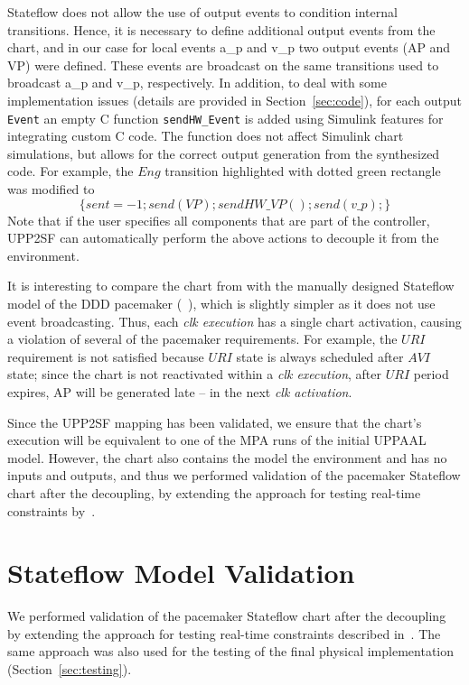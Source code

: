 Stateflow does not allow the use of output events to condition internal transitions. Hence, it is necessary to define additional output events from the chart, and in our case for local events a\_p and v\_p two output events (AP and VP) were defined. These events are broadcast on the same transitions used to broadcast a\_p and v\_p, respectively. In addition, to deal with some implementation issues (details are provided in Section~\ref{sec:code}), for each output \texttt{Event} an empty C function \texttt{sendHW\_Event} is added using Simulink features for integrating custom C code. The function does not affect Simulink chart simulations, but allows for the correct output generation from the synthesized code. For example, the $Eng$ transition highlighted with dotted green rectangle was modified to 
\begin{equation*}
[(sent==3)]\{sent=-1;send(VP);sendHW\_VP();send(v\_p);\}
\end{equation*}
Note that if the user specifies all components that are part of the controller, UPP2SF can automatically perform the above actions to decouple it from the environment.


It is interesting to compare the chart from  with the manually designed Stateflow model of the DDD pacemaker (~\cite{vhm_ecrts10}), which is slightly simpler as it does not use event broadcasting. Thus, each \textit{clk execution} has a single chart activation, causing a violation of several of the pacemaker requirements. For example, the $URI$ requirement is not satisfied because $URI$ state is always scheduled after $AVI$ state; since the chart is not reactivated within a \textit{clk execution}, after $URI$ period expires, AP will be generated late -- in the next \textit{clk activation}.


Since the UPP2SF mapping has been validated, we ensure that the chart's execution will be equivalent to one of the MPA runs of the initial UPPAAL model. However, the chart also contains the model the environment and has no inputs and outputs, and thus we performed validation of the pacemaker Stateflow chart after the decoupling, by extending the approach for testing real-time constraints by~\cite{ClarkeLee}. 
\section{Stateflow Model Validation}
\label{sec:valSF}

We performed validation of the pacemaker Stateflow chart after the decoupling by extending the approach for testing real-time constraints described in~\cite{ClarkeLee}. The same approach was also used for the testing of the final physical implementation (Section~\ref{sec:testing}).

